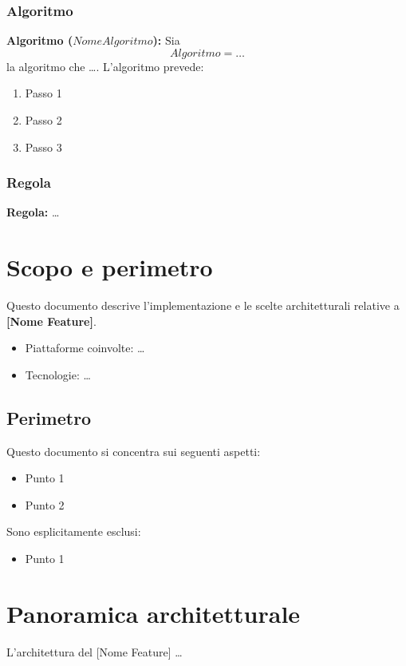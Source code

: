 \documentclass[a4paper,11pt,table,dvipsnames]{article}
\begin{document}
\subsubsection{Algoritmo}
\textbf{Algoritmo (\(NomeAlgoritmo\)):}
Sia
\[
      Algoritmo = \dots
\]
la algoritmo che \dots . L'algoritmo prevede:
\begin{enumerate}
      \item Passo 1
      \item Passo 2
      \item Passo 3
\end{enumerate}

\subsubsection{Regola}
\textbf{Regola:}
\dots


\section{Scopo e perimetro}

Questo documento descrive l'implementazione e le scelte architetturali relative a \textbf{[Nome Feature]}.

\begin{itemize}
      \item Piattaforme coinvolte: \dots
      \item Tecnologie: \dots
\end{itemize}

\subsection{Perimetro}
Questo documento si concentra sui seguenti aspetti:
\begin{itemize}
      \item Punto 1
      \item Punto 2
\end{itemize}

Sono esplicitamente esclusi:
\begin{itemize}
      \item Punto 1
\end{itemize}

\section{Panoramica architetturale}
L'architettura del [Nome Feature] \dots
\end{document}

